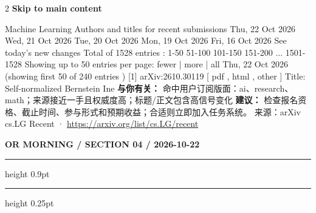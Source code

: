 \documentclass[10.5pt]{ctexart}
\begin{document}
\begin{multicols}{2}
\vspace{2mm}
{\large\bfseries Skip to main content}\par
Machine Learning Authors and titles for recent submissions Thu, 22 Oct 2026 Wed, 21 Oct 2026 Tue, 20 Oct 2026 Mon, 19 Oct 2026 Fri, 16 Oct 2026 See today's new changes Total of 1528 entries : 1-50 51-100 101-150 151-200 ... 1501-1528 Showing up to 50 entries per page: fewer | more | all Thu, 22 Oct 2026 (showing first 50 of 240 entries ) [1] arXiv:2610.30119 [ pdf , html , other ] Title: Self-normalized Bernstein Ine
\textbf{与你有关：} 命中用户订阅版面：ai、research、math；来源接近一手且权威度高；标题/正文包含高信号变化
\textbf{建议：} 检查报名资格、截止时间、参与形式和预期收益；合适则立即加入任务系统。
{\footnotesize\color{ormuted} 来源：arXiv cs.LG Recent · \url{https://arxiv.org/list/cs.LG/recent}}
\end{multicols}
\newpage
{\small\bfseries OR MORNING / SECTION 04 / 2026-10-22}
\vspace{2mm}
\hrule height 0.9pt
\vspace{1.5mm}
\hrule height 0.25pt
\vspace{4mm}
\end{document}
